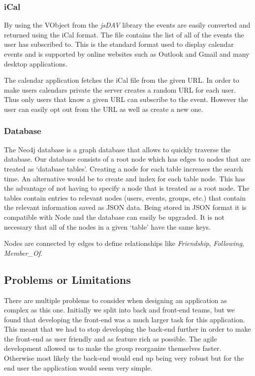 \documentclass[11pt]{article}
\begin{document}
\subsubsection{iCal}

By using the VObject from the \textit{jsDAV} library the events are easily converted and returned using the iCal format. The file contains the list of all of the events the user has subscribed to. This is the standard format used to display calendar events and is supported by online websites such as Outlook and Gmail and many desktop applications.

The calendar application fetches the iCal file from the given URL. In order to make users calendars private the server creates a random URL for each user. Thus only users that know a given URL can subscribe to the event. However the user can easily opt out from the URL as well as create a new one.

\subsubsection{Database}

The Neo4j database is a graph database that allows to quickly traverse the database.
Our database consists of a root node which has edges to nodes that are treated as `database tables'.
Creating a node for each table increases the search time. An alternative would be to create and index for each table node. This has the advantage of not having to specify a node that is treated as a root node.
The tables contain entries to relevant nodes (users, events, groups, etc.) that contain the relevant information saved as JSON data. Being stored in JSON format it is compatible with Node and the database can easily be upgraded. It is not necessary that all of the nodes in a given `table' have the same keys.

Nodes are connected by edges to define relationships like \textit{Friendship}, \textit{Following}, \textit{Member\_Of}.

\subsection{Problems or Limitations}

There are multiple problems to consider when designing an application as complex as this one.
Initially we split into back and front-end teams, but we found that developing the front-end was a much larger task for this application. This meant that we had to stop developing the back-end further in order to make the front-end as user friendly and as feature rich as possible.
The agile development allowed us to make the group reorganize themselves faster. Otherwise most likely the back-end would end up being very robust but for the end user the application would seem very simple.
\end{document}
